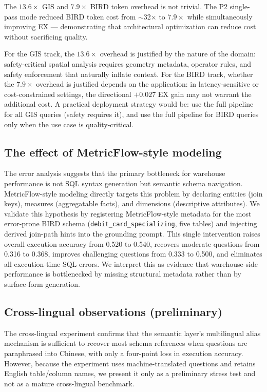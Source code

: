 \documentclass[11pt]{article}
\begin{document}
The $13.6\times$ GIS and $7.9\times$ BIRD token overhead is not trivial. The P2 single-pass mode reduced BIRD token cost from $\sim$32$\times$ to $7.9\times$ while simultaneously improving EX --- demonstrating that architectural optimization can reduce cost without sacrificing quality.

For the GIS track, the $13.6\times$ overhead is justified by the nature of the domain: safety-critical spatial analysis requires geometry metadata, operator rules, and safety enforcement that naturally inflate context. For the BIRD track, whether the $7.9\times$ overhead is justified depends on the application: in latency-sensitive or cost-constrained settings, the directional $+0.027$ EX gain may not warrant the additional cost. A practical deployment strategy would be: use the full pipeline for all GIS queries (safety requires it), and use the full pipeline for BIRD queries only when the use case is quality-critical.

\subsection{The effect of MetricFlow-style modeling}

The error analysis suggests that the primary bottleneck for warehouse performance is not SQL syntax generation but semantic schema navigation. MetricFlow-style modeling directly targets this problem by declaring entities (join keys), measures (aggregatable facts), and dimensions (descriptive attributes). We validate this hypothesis by registering MetricFlow-style metadata for the most error-prone BIRD schema (\texttt{debit\_card\_specializing}, five tables) and injecting derived join-path hints into the grounding prompt. This single intervention raises overall execution accuracy from 0.520 to 0.540, recovers moderate questions from 0.316 to 0.368, improves challenging questions from 0.333 to 0.500, and eliminates all execution-time SQL errors. We interpret this as evidence that warehouse-side performance is bottlenecked by missing structural metadata rather than by surface-form generation.

\subsection{Cross-lingual observations (preliminary)}

The cross-lingual experiment confirms that the semantic layer's multilingual alias mechanism is sufficient to recover most schema references when questions are paraphrased into Chinese, with only a four-point loss in execution accuracy. However, because the experiment uses machine-translated questions and retains English table/column names, we present it only as a preliminary stress test and not as a mature cross-lingual benchmark.
\end{document}
